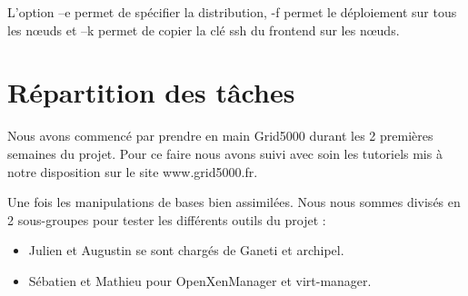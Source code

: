 L’option –e permet de spécifier la distribution, -f permet le déploiement sur tous les nœuds et –k permet de copier la clé ssh du frontend sur les nœuds.


\section{Répartition des tâches}
Nous avons commencé par prendre en main Grid5000 durant les 2 premières semaines du projet. Pour ce faire nous avons suivi avec soin les tutoriels mis à notre disposition sur le site www.grid5000.fr.

Une fois les manipulations de bases bien assimilées. Nous nous sommes divisés en 2 sous-groupes pour tester les différents outils du projet :
\begin{itemize}
  \item Julien et Augustin se sont chargés de Ganeti et archipel.
  \item Sébatien et Mathieu pour OpenXenManager et virt-manager.
\end{itemize}

